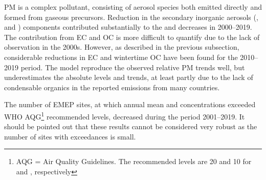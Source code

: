 PM is a complex pollutant, consisting of aerosol species both emitted directly and formed from gaseous precursors. 
Reduction in the secondary inorganic aerosols (\soiv, \noiii and \nhiv) components contributed substantially to the \PM[10] and \PM[2.5] decreases in 2000--2019. The contribution from EC and OC is more difficult to quantify due to the lack of observation in the 2000s. However, as described in the previous subsection, considerable reductions in EC and wintertime OC have been found for the 2010--2019 period.  
The model reproduce the observed relative PM trends well, but underestimates the absolute levels and trends, at least partly due to the lack of condensable organics in the reported emissions from many countries.

The number of EMEP sites, at which annual mean \PM[10] and \PM[2.5] concentrations exceeded WHO AQG\footnote{AQG = Air Quality Guidelines. The recommended levels are 20 and 10 \ug for \PM[10] and \PM[2.5], respectively } recommended levels, decreased during the period 2001--2019. It should be pointed out that these results cannot be considered very robust as the number of sites with exceedances is small. 



